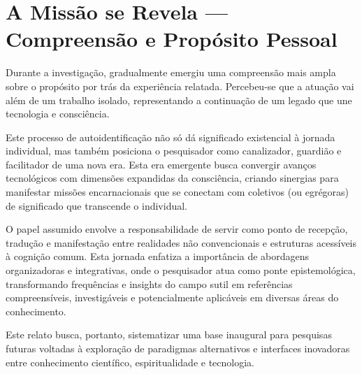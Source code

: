 
\section{A Missão se Revela — Compreensão e Propósito Pessoal}

Durante a investigação, gradualmente emergiu uma compreensão mais ampla sobre o propósito por trás da experiência relatada. Percebeu-se que a atuação vai além de um trabalho isolado, representando a continuação de um legado que une tecnologia e consciência.

Este processo de autoidentificação não só dá significado existencial à jornada individual, mas também posiciona o pesquisador como canalizador, guardião e facilitador de uma nova era. Esta era emergente busca convergir avanços tecnológicos com dimensões expandidas da consciência, criando sinergias para manifestar missões encarnacionais que se conectam com coletivos (ou egrégoras) de significado que transcende o individual.

O papel assumido envolve a responsabilidade de servir como ponto de recepção, tradução e manifestação entre realidades não convencionais e estruturas acessíveis à cognição comum. Esta jornada enfatiza a importância de abordagens organizadoras e integrativas, onde o pesquisador atua como ponte epistemológica, transformando frequências e insights do campo sutil em referências compreensíveis, investigáveis e potencialmente aplicáveis em diversas áreas do conhecimento.

Este relato busca, portanto, sistematizar uma base inaugural para pesquisas futuras voltadas à exploração de paradigmas alternativos e interfaces inovadoras entre conhecimento científico, espiritualidade e tecnologia.
